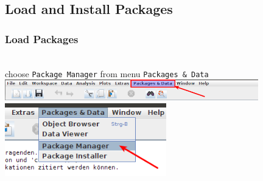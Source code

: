 \documentclass[xcolor={table},c]{beamer}
\begin{document}
\subsection{Load and Install Packages}
\begin{frame}[allowframebreaks]\frametitle{Load Packages}
\begin{center}
\\
choose \texttt{Package Manager} from menu \texttt{Packages \& Data}
  \includegraphics[width=11cm]{menupack1.png}\\
\vspace*{0.5cm}
  \includegraphics[width=7cm]{menupack2.png}
\end{center}
\end{frame}
\end{document}
